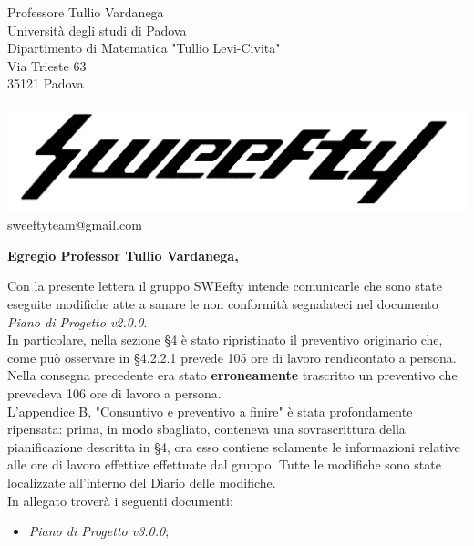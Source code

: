 \documentclass[12pt]{letter} %
\date{26/3/2018} %
\begin{document}



\begin{letter}{Professore Tullio Vardanega \\ Università degli studi di Padova \\ Dipartimento di Matematica "Tullio Levi-Civita" \\ Via Trieste 63 \\ 35121 Padova} %

\begin{center}
\includegraphics[width=\linewidth]{../../CommonImages/logo.jpg}
sweeftyteam@gmail.com
\end{center}

\opening{\textbf{Egregio Professor Tullio Vardanega,}}
\begin{addmargin}[2em]{2em}
  \hspace{1cm}
  Con la presente lettera il gruppo SWEefty intende comunicarle che sono state eseguite modifiche atte a sanare le non conformità segnalateci nel documento \emph{Piano di Progetto v2.0.0}.\\
  In particolare, nella sezione §4 è stato ripristinato il preventivo originario che, come può osservare in §4.2.2.1 prevede 105 ore di lavoro rendicontato a persona. Nella consegna precedente era stato \textbf{erroneamente} trascritto un preventivo che prevedeva 106 ore di lavoro a persona.\\
  L'appendice B, "Consuntivo e preventivo a finire" è stata profondamente ripensata: prima, in modo sbagliato, conteneva una sovrascrittura della pianificazione descritta in §4, ora esso contiene solamente le informazioni relative alle ore di lavoro effettive effettuate dal gruppo. Tutte le modifiche sono state localizzate all'interno del Diario delle modifiche.
  \\
In allegato troverà i seguenti documenti:
\begin{itemize}
	\item \emph{Piano di Progetto v3.0.0};
\end{itemize}


\end{addmargin}
\end{letter}
\end{document}
